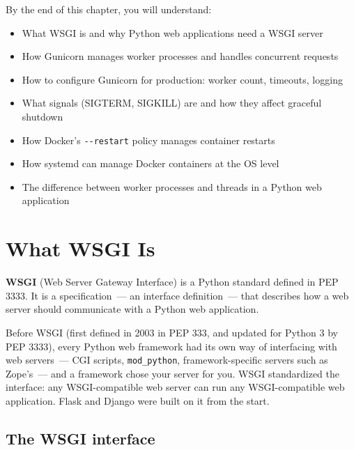 \begin{objectives}

By the end of this chapter, you will understand:

\begin{itemize}
\tightlist
\item
  What WSGI is and why Python web applications need a WSGI server
\item
  How Gunicorn manages worker processes and handles concurrent requests
\item
  How to configure Gunicorn for production: worker count, timeouts, logging
\item
  What signals (SIGTERM, SIGKILL) are and how they affect graceful shutdown
\item
  How Docker's \texttt{-\/-restart} policy manages container restarts
\item
  How systemd can manage Docker containers at the OS level
\item
  The difference between worker processes and threads in a Python web application
\end{itemize}

\end{objectives}

\setcounter{section}{0}
\section{What WSGI Is}\label{24-process-startup:241-what-wsgi-is}

\textbf{WSGI} (Web Server Gateway Interface) is a Python standard defined in PEP 3333. It is a specification~--- an interface definition~--- that describes how a web server should communicate with a Python web application.

Before WSGI (first defined in 2003 in PEP 333, and updated for Python 3 by PEP 3333), every Python web framework had its own way of interfacing with web servers~--- CGI scripts, \texttt{mod\_python}, framework-specific servers such as Zope's~--- and a framework chose your server for you. WSGI standardized the interface: any WSGI-compatible web server can run any WSGI-compatible web application. Flask and Django were built on it from the start.

\subsection*{The WSGI interface}\label{24-process-startup:the-wsgi-interface}

